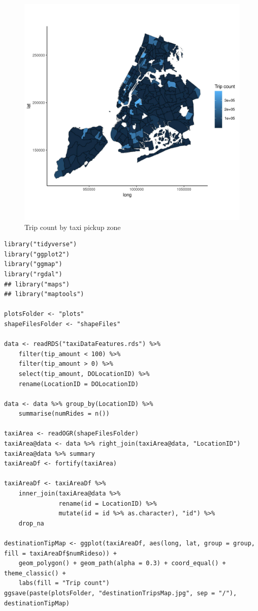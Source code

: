 \documentclass[11pt]{article}
\begin{document}
\begin{figure}[htbp]
\centering
\includegraphics[width=.9\linewidth]{./plots/pickupTripsMap.jpg}
\caption{\label{fig:org3fe7872}
Trip count by taxi pickup zone}
\end{figure}



\begin{verbatim}
library("tidyverse")
library("ggplot2")
library("ggmap")
library("rgdal")
## library("maps")
## library("maptools")

plotsFolder <- "plots"
shapeFilesFolder <- "shapeFiles"

data <- readRDS("taxiDataFeatures.rds") %>%
    filter(tip_amount < 100) %>%
    filter(tip_amount > 0) %>%
    select(tip_amount, DOLocationID) %>%
    rename(LocationID = DOLocationID)

data <- data %>% group_by(LocationID) %>%
    summarise(numRides = n())

taxiArea <- readOGR(shapeFilesFolder)
taxiArea@data <- data %>% right_join(taxiArea@data, "LocationID")
taxiArea@data %>% summary
taxiAreaDf <- fortify(taxiArea)

taxiAreaDf <- taxiAreaDf %>%
    inner_join(taxiArea@data %>%
               rename(id = LocationID) %>%
               mutate(id = id %>% as.character), "id") %>%
    drop_na

destinationTipMap <- ggplot(taxiAreaDf, aes(long, lat, group = group, fill = taxiAreaDf$numRideso)) +
    geom_polygon() + geom_path(alpha = 0.3) + coord_equal() + theme_classic() +
    labs(fill = "Trip count")
ggsave(paste(plotsFolder, "destinationTripsMap.jpg", sep = "/"), destinationTipMap)
\end{verbatim}
\end{document}
